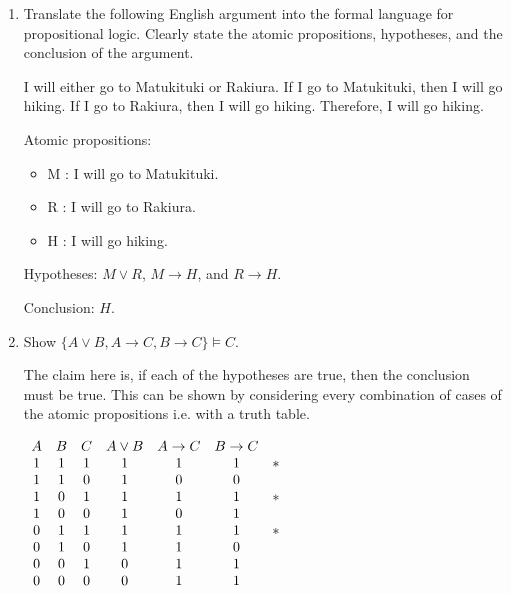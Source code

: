 \documentclass[11pt]{report}
\begin{document}
\begin{enumerate}
	\item Translate the following English argument into the formal language for propositional logic. Clearly state the atomic propositions, hypotheses, and the conclusion of the argument. 
	
	\vspace{0.5cm}

	I will either go to Matukituki or Rakiura. If I go to Matukituki, then I will go hiking. If I go to Rakiura, then I will go hiking. Therefore, I will go hiking. 
	
	\hspace{0.2cm}{\bf Solution}

	Atomic propositions: 

	\begin{itemize}
		\item[] M : I will go to Matukituki.
		\item[] R : I will go to Rakiura.
		\item[] H : I will go hiking. 
	\end{itemize}

	Hypotheses: $M \lor R$, $M \to H$, and $R \to H$. 

	Conclusion: $H$.

	\newpage
	\item Show $\{A \lor B, A\rightarrow C, B \rightarrow C\} \models C.$ 
	
	\hspace{0.2cm}{\bf Solution}

	The claim here is, if each of the hypotheses are true, then the conclusion must be true. This can be shown by considering every combination of cases of the atomic propositions i.e. with a truth table. 

	\begin{center}
		$\begin{array}{c c c c c c c}
			A & B & C & A \lor B & A \to C & B \to C & \ \\
			1 & 1 & 1 & 1 & 1 & 1 & * \\
			1 & 1 & 0 & 1 & 0 & 0 & \ \\
			1 & 0 & 1 & 1 & 1 & 1 & * \\
			1 & 0 & 0 & 1 & 0 & 1 & \ \\
			0 & 1 & 1 & 1 & 1 & 1 & * \\
			0 & 1 & 0 & 1 & 1 & 0 & \ \\
			0 & 0 & 1 & 0 & 1 & 1 & \ \\
			0 & 0 & 0 & 0 & 1 & 1
		\end{array}$
	\end{center}


\end{enumerate}
\end{document}
